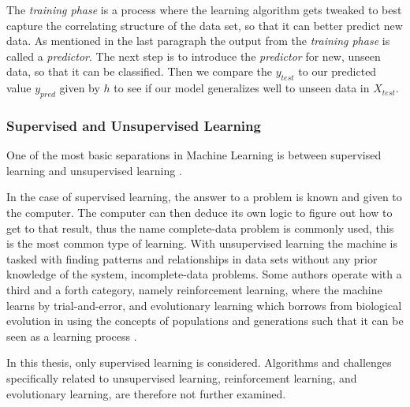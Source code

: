 	The \textit{training phase} is a process where the learning algorithm gets tweaked to best capture the correlating structure of the data set, so that it can better predict new data. As mentioned in the last paragraph the output from the \textit{training phase} is called a \textit{predictor}. The next step is to introduce the \textit{predictor} for new, unseen data, so that it can be classified. Then we compare the $y_{test}$ to our predicted value $y_{pred}$ given by $h$ to see if our model generalizes well to unseen data in $X_{test}$.
	
	\subsubsection{Supervised and Unsupervised Learning }
	One of the most basic separations in Machine Learning is between supervised learning and unsupervised learning \cite{gentle2012handbook}.
	
	In the case of supervised learning, the answer to a problem is known and given to the computer. The computer can then deduce its own logic to figure out how to get to that result, thus the name complete-data problem is commonly used, this is the most common type of learning. With unsupervised learning the machine is tasked with finding patterns and relationships in data sets without any prior knowledge of the system, incomplete-data problems. Some authors operate with a third and a forth category, namely reinforcement learning, where the machine learns by trial-and-error, and evolutionary learning which borrows from biological evolution in using the concepts of populations and generations such that it can be seen as a learning process \cite{marsland2014machine}.
		
	In this thesis, only supervised learning is considered. Algorithms and challenges specifically related to unsupervised learning, reinforcement learning, and evolutionary learning, are therefore not further examined.

